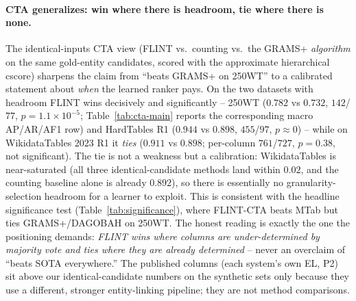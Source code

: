 \paragraph{CTA generalizes: win where there is headroom, tie where there is none.}
The identical-inputs CTA view (FLINT vs.\ counting vs.\ the GRAMS+ \emph{algorithm} on
the same gold-entity candidates, scored with the approximate hierarchical cscore)
sharpens the claim from ``beats GRAMS+ on 250WT'' to a calibrated statement about
\emph{when} the learned ranker pays. On the two datasets with headroom FLINT wins
decisively and significantly -- 250WT ($0.782$ vs $0.732$, $142$/$77$,
$p{=}1.1\times10^{-5}$; Table~\ref{tab:cta-main} reports the corresponding macro AP/AR/AF1
row) and HardTables R1 ($0.944$ vs $0.898$, $455$/$97$, $p{\approx}0$) -- while on
WikidataTables 2023 R1 it \emph{ties} ($0.911$ vs $0.898$; per-column $761$/$727$,
$p{=}0.38$, not significant). The tie is not a weakness but a calibration:
WikidataTables is near-saturated (all three identical-candidate methods land within
$0.02$, and the counting baseline alone is already $0.892$), so there is essentially no
granularity-selection headroom for a learner to exploit. This is consistent with the
headline significance test (Table~\ref{tab:significance}), where FLINT-CTA beats MTab but
ties GRAMS+/DAGOBAH on 250WT. The honest reading is exactly the one the positioning
demands: \emph{FLINT wins where columns are under-determined by majority vote and ties
where they are already determined} -- never an overclaim of ``beats SOTA everywhere.''
The published columns (each system's own EL, P2) sit above our identical-candidate
numbers on the synthetic sets only because they use a different, stronger entity-linking
pipeline; they are not method comparisons.

